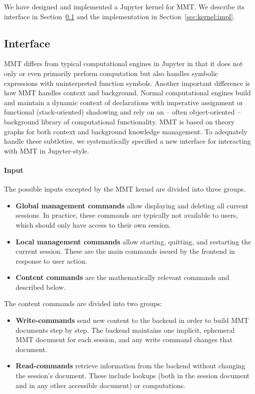 We have designed and implemented a Jupyter kernel for MMT.
We describe its interface in Section~\ref{sec:kernel:syntax} and the implementation in Section~\ref{sec:kernel:impl}.

\subsection{Interface}\label{sec:kernel:syntax}

MMT differs from typical computational engines in Jupyter in that it does not only or even primarily perform computation but also handles symbolic expressions with uninterpreted function symbols.
Another important difference is how MMT handles context and background.
Normal computational engines build and maintain a dynamic context of declarations with imperative assignment  or functional (stack-oriented) shadowing and rely on an -- often object-oriented -- background library of computational functionality.
MMT is based on theory graphs for both context and background knowledge management. 
To adequately handle these subtleties, we systematically specified a new interface for interacting with MMT in Jupyter-style.  

\paragraph{Input}
The possible inputs excepted by the MMT kernel are divided into three groups.
\begin{itemize}
\item \textbf{Global management commands} allow displaying and deleting all current sessions.
 In practice, these commands are typically not available to users, which should only have access to their own session.
\item \textbf{Local management commands} allow starting, quitting, and restarting the current session. These are the main commands issued by the frontend in response to user action.
\item \textbf{Content commands} are the mathematically relevant commands and described below.
\end{itemize}

The content commands are divided into two groups:
\begin{itemize}
 \item \textbf{Write-commands} send new content to the backend in order to build MMT documents step by step.
   The backend maintains one implicit, ephemeral MMT document for each session, and any write command changes that document.
 \item \textbf{Read-commands} retrieve information from the backend without changing the session's document.
   These include lookups (both in the session document and in any other accessible document) or computations.
\end{itemize}


